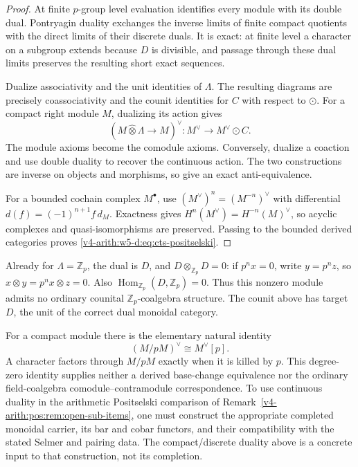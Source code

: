 \begin{proof}
At finite \(p\)-group level evaluation identifies every module with
its double dual. Pontryagin duality exchanges the inverse limits of
finite compact quotients with the direct limits of their discrete
duals. It is exact: at finite level a character on a subgroup extends
because \(D\) is divisible, and passage through these dual limits
preserves the resulting short exact sequences.

Dualize associativity and the unit identities of \(\Lambda\).
The resulting diagrams are precisely coassociativity and the counit
identities for \(C\) with respect to \(\odot\).
For a compact right module \(M\), dualizing its action gives
\[
 (M\widehat\otimes\Lambda\longrightarrow M)^\vee:
 M^\vee\longrightarrow M^\vee\odot C.
\]
The module axioms become the comodule axioms. Conversely, dualize a
coaction and use double duality to recover the continuous action.
The two constructions are inverse on objects and morphisms, so give
an exact anti-equivalence.

For a bounded cochain complex \(M^\bullet\), use
\((M^\vee)^n=(M^{-n})^\vee\) with differential
\(d(f)=(-1)^{n+1}f\,d_M\). Exactness gives
\(H^n(M^\vee)=H^{-n}(M)^\vee\), so acyclic complexes and
quasi-isomorphisms are preserved. Passing to the bounded derived
categories proves \eqref{v4-arith:w5-d:eq:cts-positselski}.
\end{proof}

\begin{remark}
\label{v4-arith:w5-d:cts-dual:rem:domain}
Already for \(\Lambda=\mathbb Z_p\), the dual is \(D\), and
\(D\otimes_{\mathbb Z_p}D=0\): if \(p^nx=0\), write
\(y=p^nz\), so \(x\otimes y=p^nx\otimes z=0\).
Also \(\operatorname{Hom}_{\mathbb Z_p}(D,\mathbb Z_p)=0\).
Thus this nonzero module admits no ordinary counital
\(\mathbb Z_p\)-coalgebra structure. The counit above has target
\(D\), the unit of the correct dual monoidal category.

For a compact module there is the elementary natural identity
\begin{equation}
\label{v4-arith:w5-d:eq:base-change-square}
 (M/pM)^\vee\cong M^\vee[p].
\end{equation}
A character factors through \(M/pM\) exactly when it is killed by
\(p\). This degree-zero identity supplies neither a derived
base-change equivalence nor the ordinary field-coalgebra
comodule--contramodule correspondence. To use continuous duality in
the arithmetic Positselski comparison of
Remark~\ref{v4-arith:pos:rem:open-sub-items}, one must construct the
appropriate completed monoidal carrier, its bar and cobar functors,
and their compatibility with the stated Selmer and pairing data.
The compact/discrete duality above is a concrete input to that
construction, not its completion.
\end{remark}

